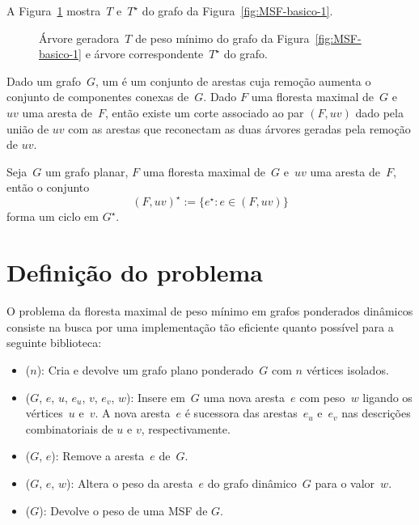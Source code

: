 A Figura~\ref{fig:MSF-figura-2} mostra~$T$ e~$T^\star$ do grafo da Figura~\ref{fig:MSF-basico-1}.

\begin{figure}[htb]
\scalebox{1.5}{
\centering

}
\caption{Árvore geradora~$T$ de peso mínimo do grafo da Figura~\ref{fig:MSF-basico-1} e árvore correspondente~$T^\star$ do grafo.}
\label{fig:MSF-figura-2}
\end{figure}



Dado um grafo~$G$, um  é um conjunto de arestas cuja remoção aumenta o conjunto de componentes conexas de~$G$.
Dado $F$ uma floresta maximal de~$G$ e~$uv$ uma aresta de~$F$, então existe um corte associado ao par $(F, uv)$ dado pela união de $uv$ com as arestas que reconectam as duas árvores geradas pela remoção de $uv$.


\begin{theorem}
\label{teo:cutset}
Seja~$G$ um grafo planar, $F$ uma floresta maximal de~$G$ e~$uv$ uma aresta de~$F$, então o conjunto
$$
(F, uv)^\star := \{e^\star:e\in (F, uv)\}
$$
forma um ciclo em $G^\star$.
\end{theorem}


\section{Definição do problema}
\label{sec:definition-MSF}
O problema da floresta maximal de peso mínimo em grafos ponderados dinâmicos consiste na busca por uma implementação tão eficiente quanto possível para a seguinte biblioteca:

\begin{itemize}
\item \MSFCreate($n$): Cria e devolve um grafo plano ponderado~$G$ com $n$ vértices isolados.
\item \MSFaddEdge($G$, $e$, $u$, $e_u$, $v$, $e_v$, $w$): Insere em~$G$ uma nova aresta~$e$ com peso~$w$ ligando os vértices~$u$ e~$v$. A nova aresta~$e$ é sucessora das arestas~$e_u$ e~$e_v$ nas descrições combinatoriais de $u$ e $v$, respectivamente.
\item \MSFdelEdge($G$, $e$): Remove a aresta~$e$ de~$G$.
\item \MSFupdate($G$, $e$, $w$): Altera o peso da aresta~$e$ do grafo dinâmico~$G$ para o valor~$w$.
\item \MSFweight($G$): Devolve o peso de uma MSF de $G$.
\end{itemize}


